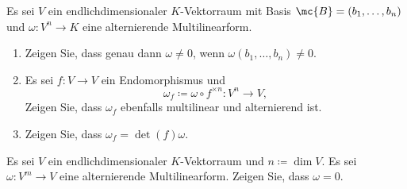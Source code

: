 

\begin{question}
  Es sei $V$ ein endlichdimensionaler $K$-Vektorraum mit Basis $\mc{B} = (b_1, \dotsc, b_n)$ und $\omega \colon V^n \to K$ eine alternierende Multilinearform.
  \begin{enumerate}
    \item
      Zeigen Sie, dass genau dann $\omega \neq 0$, wenn $\omega(b_1, \dotsc, b_n) \neq 0$.
    \item
      Es sei $f \colon V \to V$ ein Endomorphismus und
      \[
        \omega_f \coloneqq \omega \circ f^{\times n} \colon V^n \to V,
      \]
      Zeigen Sie, dass $\omega_f$ ebenfalls multilinear und alternierend ist.
    \item
      Zeigen Sie, dass $\omega_f = \det(f) \omega$.
  \end{enumerate}
\end{question}


\begin{question}
  Es sei $V$ ein endlichdimensionaler $K$-Vektorraum und $n \coloneqq \dim V$.
  Es sei $\omega \colon V^m \to V$ eine alternierende Multilinearform.
  Zeigen Sie, dass $\omega = 0$.
\end{question}


